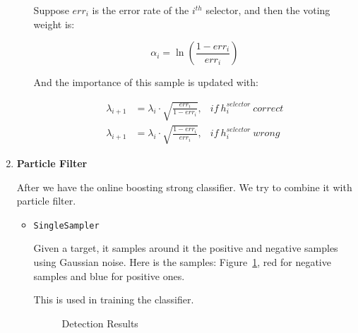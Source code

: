 \documentclass[a4paper]{article}
\begin{document}
\begin{enumerate}
\begin{itemize}
Suppose $err_i$ is the error rate of the $i^{th}$ selector, and then the voting weight is:

\begin{equation}
\alpha_i=\ln(\frac{1-err_i}{err_i})
\end{equation}

And the importance of this sample is updated with:

\begin{subequations}
\begin{align}
\lambda_{i+1}&=\lambda_i\cdot\sqrt{\frac{err_i}{1-err_i}}, &if~h^{selector}_{i}~correct\\
\lambda_{i+1}&=\lambda_i\cdot\sqrt{\frac{1-err_i}{err_i}}, &if~h^{selector}_{i}~wrong
\end{align}
\end{subequations}
\end{itemize}

\item \textbf{Particle Filter}

After we have the online boosting strong classifier. We try to combine it with particle filter.

\begin{itemize}

\item \lstinline{SingleSampler}

Given a target, it samples around it the positive and negative samples using Gaussian noise. Here is the samples: Figure~\ref{fig:singlesampler}, red for negative samples and blue for positive ones.

This is used in training the classifier.

\begin{figure}[htb]
    \begin{center}
    \end{center}
    \caption{Detection Results}
    \label{fig:singlesampler}
\end{figure}


\end{itemize}
\end{enumerate}
\end{document}
